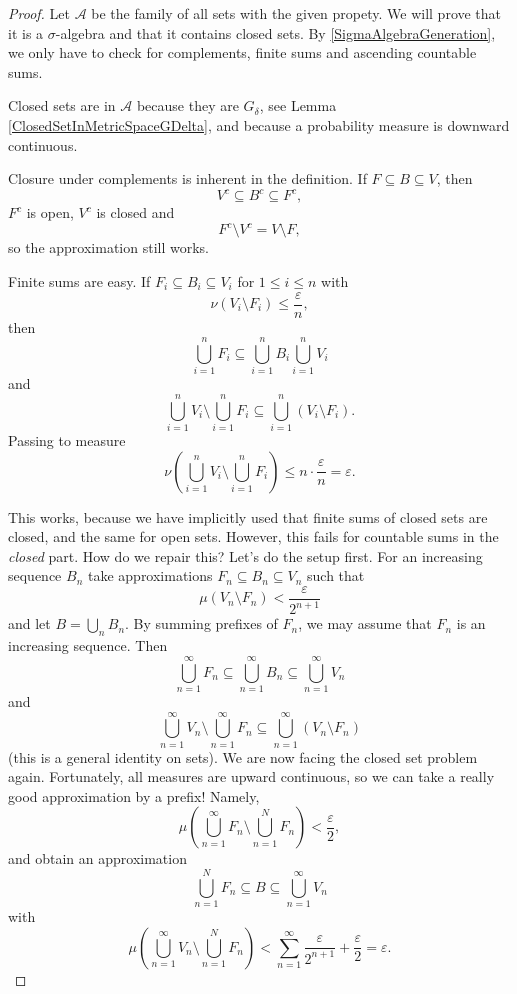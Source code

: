 \begin{proof}
    Let \( \mathcal{A} \) be the family of all sets with the given propety. We will prove that it is a \( \sigma \)-algebra and that it contains closed sets. By \ref{SigmaAlgebraGeneration}, we only have to check for complements, finite sums and ascending countable sums.

    Closed sets are in \( \mathcal{A} \) because they are \( G_\delta \), see Lemma \ref{ClosedSetInMetricSpaceGDelta}, and because a probability measure is downward continuous.

    Closure under complements is inherent in the definition. If \( F \subseteq B \subseteq V \), then 
    \[ 
      V^c \subseteq B^c \subseteq F^c,
   \]
   \( F^c \) is open, \( V^c \) is closed and
   \[ 
      F^c \setminus V^c = V \setminus F, 
  \]
  so the approximation still works.

Finite sums are easy. If \( F_i \subseteq B_i \subseteq V_i \) for \( 1 \leqslant i \leqslant n \) with
\[ 
    \nu \left( V_i \setminus F_i \right) \leqslant \frac{\varepsilon }{n}, 
\]
then
\[ 
\bigcup_{i=1}^n F_i \subseteq \bigcup_{i=1}^n B_i \bigcup_{i=1}^n V_i
\]
and 
\[ 
    \bigcup_{i=1}^n V_i \setminus \bigcup_{i=1}^n F_i \subseteq \bigcup_{i=1}^n (V_i \setminus F_i).
\]
Passing to measure
\[ 
    \nu \left( \bigcup_{i=1}^n V_i \setminus \bigcup_{i=1}^n F_i \right) \leqslant n \cdot \frac{\varepsilon }{n} =\varepsilon. 
\]

This works, because we have implicitly used that finite sums of closed sets are closed, and the same for open sets. However, this fails for countable sums in the \emph{closed} part. How do we repair this? Let's do the setup first. For an increasing sequence \( B_n \) take approximations \( F_n \subseteq B_n \subseteq V_n \) such that
\[ 
    \mu \left( V_n \setminus F_n \right) < \frac{\varepsilon }{2^{n+1}}
\]
and let \( B = \bigcup_n B_n \). By summing prefixes of \( F_n \), we may assume that \( F_n \) is an increasing sequence. Then
\[ 
    \bigcup_{n=1}^\infty F_n \subseteq \bigcup_{n=1}^\infty B_n \subseteq \bigcup_{n=1}^\infty V_n
\]
and
\[ 
    \bigcup_{n=1}^\infty V_n \setminus \bigcup_{n=1}^\infty F_n \subseteq \bigcup_{n=1}^\infty (V_n \setminus F_n) 
\]
(this is a general identity on sets). We are now facing the closed set problem again. Fortunately, all measures are upward continuous, so we can take a really good approximation by a prefix! Namely,
\[ 
    \mu \left( \bigcup_{n=1}^\infty F_n \setminus \bigcup_{n=1}^N F_n \right) < \frac{\varepsilon }{2},
\]
and obtain an approximation
\[ 
    \bigcup_{n=1}^N F_n \subseteq B \subseteq \bigcup_{n=1}^\infty V_n 
\]
with
\[ 
    \mu \left( \bigcup_{n=1}^\infty V_n \setminus \bigcup_{n=1}^N F_n \right) < \sum_{n=1}^\infty \frac{\varepsilon }{2^{n+1}} + \frac{\varepsilon }{2} =\varepsilon.
\]
\end{proof}

